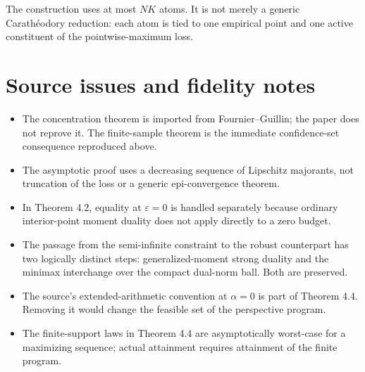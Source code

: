 The construction uses at most $NK$ atoms.  It is not merely a generic Carath\'eodory reduction: each atom is tied to one empirical point and one active constituent of the pointwise-maximum loss.

\section*{Source issues and fidelity notes}
\begin{itemize}[leftmargin=2em]
\item The concentration theorem is imported from Fournier--Guillin; the paper does not reprove it.  The finite-sample theorem is the immediate confidence-set consequence reproduced above.
\item The asymptotic proof uses a decreasing sequence of Lipschitz majorants, not truncation of the loss or a generic epi-convergence theorem.
\item In Theorem 4.2, equality at $\varepsilon=0$ is handled separately because ordinary interior-point moment duality does not apply directly to a zero budget.
\item The passage from the semi-infinite constraint to the robust counterpart has two logically distinct steps: generalized-moment strong duality and the minimax interchange over the compact dual-norm ball.  Both are preserved.
\item The source's extended-arithmetic convention at $\alpha=0$ is part of Theorem 4.4.  Removing it would change the feasible set of the perspective program.
\item The finite-support laws in Theorem 4.4 are asymptotically worst-case for a maximizing sequence; actual attainment requires attainment of the finite program.
\end{itemize}



